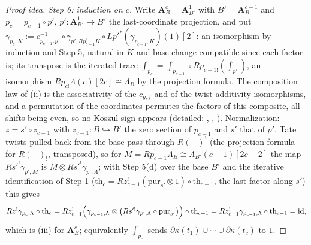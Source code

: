 \documentclass[11pt]{article}
\theoremstyle{plain}
\theoremstyle{definition}
\newcommand{\Aaf}{\mathbf A}
\begin{document}
\begin{proof}[Proof idea]
\emph{Step 6: induction on $c$.}  Write $\Aaf^c_B=\Aaf^1_{B'}$ with
$B'=\Aaf^{c-1}_B$ and $p_c=p_{c-1}\circ p'$, $p':\Aaf^1_{B'}\to B'$ the
last-coordinate projection, and put
$\gamma_{p_c,K}:=c_{p_{c-1},p'}^{-1}\circ\gamma_{p',Rp_{c-1}^{!}K}\circ
Lp'^{*}(\gamma_{p_{c-1},K})(1)[2]$:  an isomorphism by induction and Step 5,
natural in $K$ and base-change compatible since each factor is; its
transpose is the iterated trace
$\int_{p_c}=\int_{p_{c-1}}\circ Rp_{c-1!}(\int_{p'})$, an isomorphism
$Rp_{c!}\Lambda(c)[2c]\cong\Lambda_B$ by the projection formula.  The
composition law of (ii) is the associativity of the $c_{g,f}$ and of the
twist-additivity isomorphisms, and a permutation of the coordinates permutes
the factors of this composite, all shifts being even, so no Koszul sign
appears (detailed: ,
,
).  Normalization:
$z=s'\circ z_{c-1}$ with $z_{c-1}:B\hookrightarrow B'$ the zero section of
$p_{c-1}$ and $s'$ that of $p'$.  Tate twists pulled back from the base pass
through $R(-)^{!}$ (the projection formula for $R(-)_!$, transposed), so for
$M=Rp_{c-1}^{!}\Lambda_B\cong\Lambda_{B'}(c-1)[2c-2]$ the map
$Rs'^{!}\gamma_{p',M}$ is $M\otimes Rs'^{!}\gamma_{p',\Lambda}$; with Step 5(d)
over the base $B'$ and the iterative identification of Step 1
($\mathrm{th}_c=Rz_{c-1}^{!}(\mathrm{pur}_{s'}\otimes1)\circ\mathrm{th}_{c-1}$,
the last factor along $s'$) this gives
\[
Rz^{!}\gamma_{p_c,\Lambda}\circ\mathrm{th}_c
=Rz_{c-1}^{!}\Bigl(\gamma_{p_{c-1},\Lambda}\otimes
\bigl(Rs'^{!}\gamma_{p',\Lambda}\circ\mathrm{pur}_{s'}\bigr)\Bigr)\circ
\mathrm{th}_{c-1}
=Rz_{c-1}^{!}\gamma_{p_{c-1},\Lambda}\circ\mathrm{th}_{c-1}=\mathrm{id},
\]
which is (iii) for $\Aaf^c_B$; equivalently $\int_{p_c}$ sends
$\partial\kappa(t_1)\cup\cdots\cup\partial\kappa(t_c)$ to $1$.


\end{proof}
\end{document}

